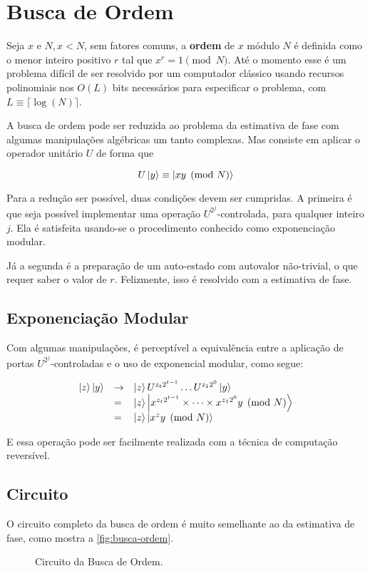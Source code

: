 \section{Busca de Ordem}\label{sec:busca-de-ordem}

Seja \(x\) e \(N, x < N\), sem fatores comuns, a \textbf{ordem} de \(x\)
módulo \(N\) é definida como o menor inteiro positivo \(r\) tal que
\(x^r = 1 \pmod N\).
Até o momento esse é um problema difícil de ser resolvido por um computador clássico usando recursos polinomiais nos \(O(L)\) bits necessários para especificar o problema, com \(L \equiv \lceil \log (N) \rceil\).

A busca de ordem pode ser reduzida ao problema da estimativa de fase com
algumas manipulações algébricas um tanto complexas\cite{nielsen_chuang_2010}.
Mas consiste em aplicar o operador unitário \(U\) de forma que

\[
    U \ket{y} \equiv \ket{x y \pmod N}
\]

Para a redução ser possível, duas condições devem ser cumpridas.
A primeira é que seja possível implementar uma operação
\(U^{2^j}\)-controlada, para qualquer inteiro \(j\).
Ela é satisfeita usando-se o procedimento conhecido como {exponenciação modular}.

Já a segunda é a preparação de um auto-estado com autovalor não-trivial,
o que requer saber o valor de \(r\).
Felizmente, isso é resolvido com a estimativa de fase.

\subsection{Exponenciação Modular}\label{subsec:exponenciacao-modular}

Com algumas manipulações, é perceptível a equivalência entre a aplicação
de portas \(U^{2^j}\)-controladas e o uso de {exponencial modular}, como
segue:

\[
    \begin{array}{lll}
        \ket{z}\ket{y} &\to& \ket{z} U^{z_t 2^{t-1}} \dots U^{z_1 2^0} \ket{y} \\
        &=& \ket{z} \ket{x^{z_t 2^{t-1}} \times \dots \times x^{z_1 2^0} y \pmod N} \\
        &=& \ket{z} \ket{x^z y \pmod N}
    \end{array}
\]

E essa operação pode ser facilmente realizada com a técnica de
computação reversível.

\subsection{Circuito}\label{subsec:circuito}

O circuito completo da busca de ordem é muito semelhante ao da
estimativa de fase, como mostra a \autoref{fig:busca-ordem}.

\begin{figure}[!htb]
    \centering
    
    \caption{Circuito da Busca de Ordem.}
    \label{fig:busca-ordem}
\end{figure}
